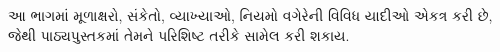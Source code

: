 \documentclass[../../include/open-logic-part]{subfiles}
\begin{document}

\begin{editorial}
  આ ભાગમાં મૂળાક્ષરો, સંકેતો, વ્યાખ્યાઓ,
  નિયમો વગેરેની વિવિધ યાદીઓ એકત્ર કરી છે,
  જેથી પાઠ્યપુસ્તકમાં તેમને પરિશિષ્ટ
  તરીકે સામેલ કરી શકાય.
\end{editorial}



\OLEndPartHook
\end{document}
